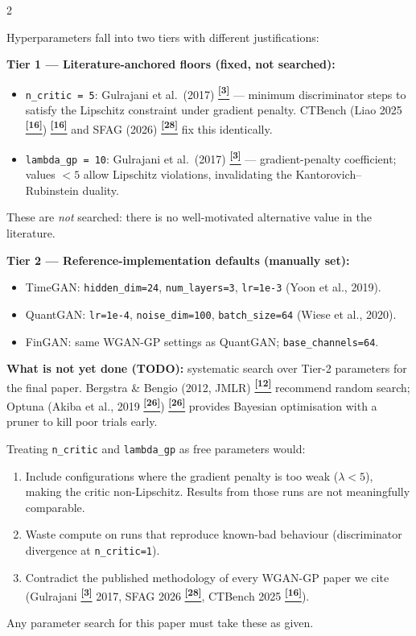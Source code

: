 \documentclass[10pt]{article}
\newcommand{\navybox}[2]{\begin{tcolorbox}[mybox={Navy}{LBg},title={#1}]#2\end{tcolorbox}}
\newcommand{\redbox}[2]{\begin{tcolorbox}[mybox={DRed}{RBg},title={#1}]#2\end{tcolorbox}}
\newcommand{\tcite}[1]{%
  \hyperlink{R:#1}{\textsuperscript{\scriptsize\textbf{[#1]}}}}
\begin{document}
\begin{multicols}{2}

\navybox{Hyperparameter Selection: Two Tiers}{%
Hyperparameters fall into two tiers with different justifications:

\smallskip
\textbf{Tier 1 --- Literature-anchored floors (fixed, not searched):}
\begin{itemize}
  \item \texttt{n\_critic = 5}: Gulrajani et al.\ (2017)\tcite{3} --- minimum discriminator steps to satisfy the Lipschitz constraint under gradient penalty. CTBench (Liao 2025\tcite{16})\tcite{16} and SFAG (2026)\tcite{28} fix this identically.
  \item \texttt{lambda\_gp = 10}: Gulrajani et al.\ (2017)\tcite{3} --- gradient-penalty coefficient; values $< 5$ allow Lipschitz violations, invalidating the Kantorovich--Rubinstein duality.
\end{itemize}
These are \emph{not} searched: there is no well-motivated alternative value in the literature.

\smallskip
\textbf{Tier 2 --- Reference-implementation defaults (manually set):}
\begin{itemize}
  \item TimeGAN: \texttt{hidden\_dim=24}, \texttt{num\_layers=3}, \texttt{lr=1e-3} (Yoon et al., 2019).
  \item QuantGAN: \texttt{lr=1e-4}, \texttt{noise\_dim=100}, \texttt{batch\_size=64} (Wiese et al., 2020).
  \item FinGAN: same WGAN-GP settings as QuantGAN; \texttt{base\_channels=64}.
\end{itemize}

\textbf{What is not yet done (TODO):} systematic search over Tier-2 parameters for the final paper. Bergstra \& Bengio (2012, JMLR)\tcite{12} recommend random search; Optuna (Akiba et al., 2019\tcite{26})\tcite{26} provides Bayesian optimisation with a pruner to kill poor trials early.}

\redbox{Why These Floors Cannot Be Grid-Searched}{%
Treating \texttt{n\_critic} and \texttt{lambda\_gp} as free parameters would:
\begin{enumerate}
  \item Include configurations where the gradient penalty is too weak ($\lambda < 5$), making the critic non-Lipschitz. Results from those runs are not meaningfully comparable.
  \item Waste compute on runs that reproduce known-bad behaviour (discriminator divergence at \texttt{n\_critic=1}).
  \item Contradict the published methodology of every WGAN-GP paper we cite (Gulrajani\tcite{3} 2017, SFAG 2026\tcite{28}, CTBench 2025\tcite{16}).
\end{enumerate}
Any parameter search for this paper must take these as given.}


\end{multicols}
\end{document}
